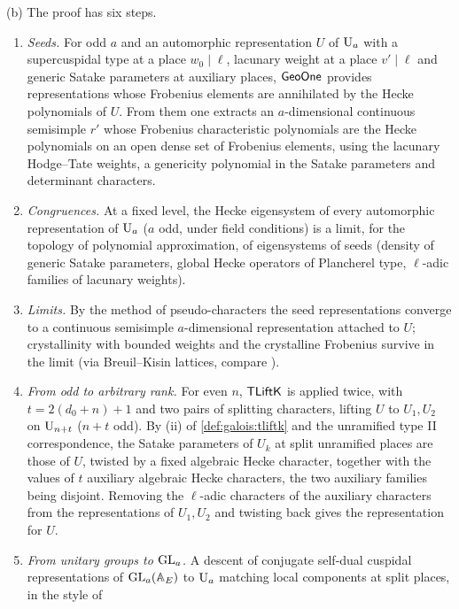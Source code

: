 \begin{proofoutline}
(b) The proof has six steps.
\begin{enumerate}[label=(\roman*),nosep]
\item \emph{Seeds.} For odd $a$ and an automorphic representation $U$ of $\mathrm{U}_a$ with a
  supercuspidal type at a place $w_0\mid\ell$, lacunary weight at a place $v'\mid\ell$ and generic
  Satake parameters at auxiliary places, $\mathsf{GeoOne}$ provides representations whose Frobenius
  elements are annihilated by the Hecke polynomials of $U$. From them one extracts an $a$-dimensional
  continuous semisimple $r'$ whose Frobenius characteristic polynomials are the Hecke polynomials on
  an open dense set of Frobenius elements, using the lacunary Hodge--Tate weights, a genericity
  polynomial in the Satake parameters and determinant characters.
\item \emph{Congruences.} At a fixed level, the Hecke eigensystem of every automorphic representation
  of $\mathrm{U}_a$ ($a$ odd, under field conditions) is a limit, for the topology of polynomial
  approximation, of eigensystems of seeds (density of generic Satake parameters, global Hecke
  operators of Plancherel type, $\ell$-adic families of lacunary weights).
\item \emph{Limits.} By the method of pseudo-characters \cite{Taylor1991,BellaicheChenevier2009,Chenevier2014}
  the seed representations converge to a continuous semisimple $a$-dimensional representation
  attached to $U$; crystallinity with bounded weights and the crystalline Frobenius survive in the
  limit (via Breuil--Kisin lattices, compare \cite{Berger2004,Kisin2008}).
\item \emph{From odd to arbitrary rank.} For even $n$, $\mathsf{TLiftK}$ is applied twice, with
  $t=2(d_0+n)+1$ and two pairs of splitting characters, lifting $U$ to $U_1,U_2$ on $\mathrm{U}_{n+t}$
  ($n+t$ odd). By (ii) of \cref{def:galois:tliftk} and the unramified type II correspondence, the Satake
  parameters of $U_k$ at split unramified places are those of $U$, twisted by a fixed algebraic Hecke
  character, together with the values of $t$ auxiliary algebraic Hecke characters, the two auxiliary
  families being disjoint. Removing the $\ell$-adic characters \cite{Serre1968} of the auxiliary
  characters from the representations of $U_1,U_2$ and twisting back gives the representation for $U$.
\item \emph{From unitary groups to $\operatorname{GL}_a$.} A descent of conjugate self-dual cuspidal representations
  of $\operatorname{GL}_a(\mathbb{A}_E)$ to $\mathrm{U}_a$ matching local components at split places, in the style of

\end{enumerate}
\end{proofoutline}
